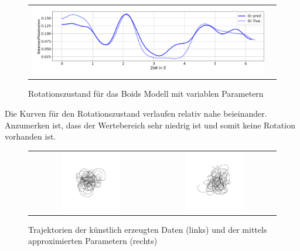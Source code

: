 \begin{figure}[H]
\centering
\begin{tabular}{cc}
\includegraphics[width=1.0\textwidth]{figures/Experimente/Parameter_variabel/Boids_ROT.png} 
\end{tabular}
\caption{Rotationszustand für das Boids Modell mit variablen Parametern \label{fig:Boids_PV_ROT}}
\end{figure}
Die Kurven für den Rotationszustand verlaufen relativ nahe beieinander. Anzumerken ist, dass der Wertebereich sehr niedrig ist und somit keine Rotation vorhanden ist.


\begin{figure}[H]
\centering
\begin{tabular}{cc}
\includegraphics[width=0.5\textwidth]{figures/Experimente/Parameter_variabel/Boids_sim_fake.png}&
\includegraphics[width=0.5\textwidth]{figures/Experimente/Parameter_variabel/Boids_sim_fake1.png}
\end{tabular}
\caption{Trajektorien der künstlich erzeugten Daten (links) und der mittels approximierten Parametern (rechts) \label{fig:AP}}
\end{figure}

